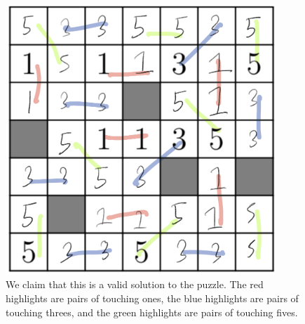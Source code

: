 \documentclass[10pt]{../usamts}
\begin{document}
\begin{solution}{1}
\begin{figure}[htbp]
    \includegraphics[width=4in]{p1.jpeg}
    \caption{We claim that this is a valid solution to the puzzle. The red highlights are pairs of touching ones, the blue highlights are pairs of touching threes, and the green highlights are pairs of touching fives.}
\end{figure}
\end{solution}
\end{document}
